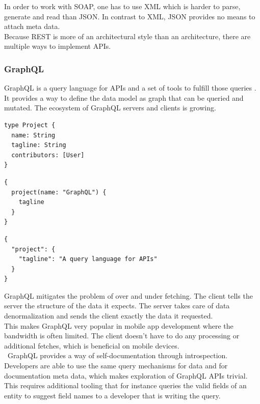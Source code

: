 In order to work with SOAP, one has to use XML  which is harder to parse, generate and read than JSON. In contrast to XML, JSON provides no means to attach meta data. \\
Because REST is more of an architectural style than an architecture, there are multiple ways to implement APIs.

\subsubsection{GraphQL}\label{graphql}
GraphQL is a query language for APIs and a set of tools to fulfill those queries \citep{graphql}. It provides a way to define the data model as graph that can be queried and mutated. The ecosystem of GraphQL servers and clients is growing.

\lstset{language=GraphQL}
\begin{lstlisting}[caption=Simple data model in the GraphQL data description language.]
type Project {
  name: String
  tagline: String
  contributors: [User]
}
\end{lstlisting}
\lstset{language=GraphQL}
\begin{lstlisting}[caption=Example of a GraphQL query to fetch the tagline of a certain project.]
{
  project(name: "GraphQL") {
    tagline
  }
}
\end{lstlisting}
\lstset{language=JSON}
\begin{lstlisting}[caption=Response of the GraphQL server in JSON.]
{
  "project": {
    "tagline": "A query language for APIs"
  }
}\end{lstlisting}

GraphQL mitigates the problem of over and under fetching. The client tells the server the structure of the data it expects. The server takes care of data denormalization and sends the client exactly the data it requested. \\ This makes GraphQL very popular in mobile app development where the bandwidth is often limited. The client doesn't have to do any processing or additional fetches, which is beneficial on mobile devices. \\\
GraphQL provides a way of self-documentation through introspection. Developers are able to use the same query mechanisms for data and for documentation meta data, which makes exploration of GraphQL APIs trivial. This requires additional tooling that for instance queries the valid fields of an entity to suggest field names to a developer that is writing the query.

